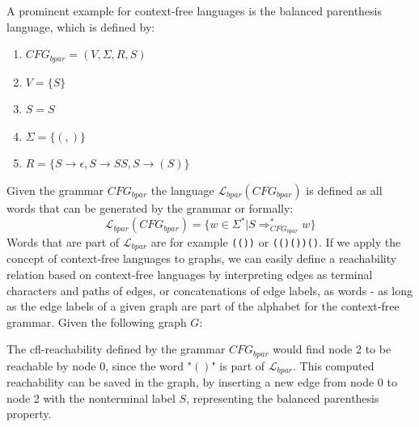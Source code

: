 A prominent example for context-free languages is the balanced parenthesis language, which is defined by:
\begin{enumerate}
    \item $CFG_{bpar}=(V,\Sigma,R,S)$
    \item $V=\{S\}$
    \item $S=S$
    \item $\Sigma=\{(,)\}$
    \item $R=\{S\rightarrow\epsilon, S\rightarrow SS, S\rightarrow (S)\}$
\end{enumerate}
Given the grammar $CFG_{bpar}$ the language $\mathcal{L}_{bpar}(CFG_{bpar})$ is defined as all words that can be generated by the grammar or formally: $$\mathcal{L}_{bpar}(CFG_{bpar})= \{w\in \Sigma^* | S\Rightarrow_{CFG_{bpar}}^* w \}$$
Words that are part of $\mathcal{L}_{bpar}$ are for example \verb|(())| or \verb|(()())()|.
If we apply the concept of context-free languages to graphs, we can easily define a reachability relation based on context-free languages by interpreting edges as terminal characters and paths of edges, or concatenations of edge labels, as words - as long as the edge labels of a given graph are part of the alphabet for the context-free grammar.
Given the following graph $G$:
\begin{center}
\end{center}
The cfl-reachability defined by the grammar $CFG_{bpar}$ would find node 2 to be reachable by node 0, since the word "$()$" is part of $\mathcal{L}_{bpar}$.
This computed reachability can be saved in the graph, by inserting a new edge from node 0 to node 2 with the nonterminal label $S$, representing the balanced parenthesis property.
